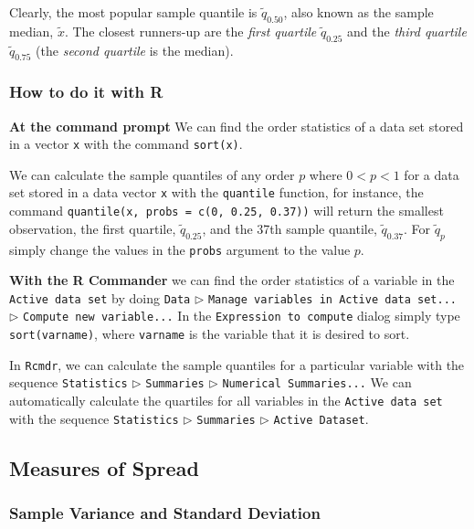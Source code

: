 \documentclass[]{book}
\numberwithin{equation}{chapter}
\numberwithin{figure}{chapter}
\theoremstyle{plain}
\theoremstyle{definition}
\theoremstyle{remark}
\theoremstyle{definition}
\theoremstyle{definition}
\theoremstyle{remark}
\begin{document}
Clearly, the most popular sample quantile is \(\tilde{q}_{0.50}\), also
known as the sample median, \(\tilde{x}\). The closest runners-up are
the \emph{first quartile} \(\tilde{q}_{0.25}\) and the \emph{third
quartile} \(\tilde{q}_{0.75}\) (the \emph{second quartile} is the
median).

\subsubsection{How to do it with R}\label{how-to-do-it-with-r-1}

\textbf{At the command prompt} We can find the order statistics of a
data set stored in a vector \texttt{x} with the command
\texttt{sort(x)}.

We can calculate the sample quantiles of any order \(p\) where \(0<p<1\)
for a data set stored in a data vector \texttt{x} with the
\texttt{quantile} function, for instance, the command
\texttt{quantile(x,\ probs\ =\ c(0,\ 0.25,\ 0.37))} will return the
smallest observation, the first quartile, \(\tilde{q}_{0.25}\), and the
37th sample quantile, \(\tilde{q}_{0.37}\). For \(\tilde{q}_{p}\) simply
change the values in the \texttt{probs} argument to the value \(p\).

\textbf{With the R Commander} we can find the order statistics of a
variable in the \texttt{Active\ data\ set} by doing \texttt{Data}
\(\triangleright\) \texttt{Manage\ variables\ in\ Active\ data\ set...}
\(\triangleright\) \texttt{Compute\ new\ variable...} In the
\texttt{Expression\ to\ compute} dialog simply type
\texttt{sort(varname)}, where \texttt{varname} is the variable that it
is desired to sort.

In \texttt{Rcmdr}, we can calculate the sample quantiles for a
particular variable with the sequence \texttt{Statistics}
\(\triangleright\) \texttt{Summaries} \(\triangleright\)
\texttt{Numerical\ Summaries...} We can automatically calculate the
quartiles for all variables in the \texttt{Active\ data\ set} with the
sequence \texttt{Statistics} \(\triangleright\) \texttt{Summaries}
\(\triangleright\) \texttt{Active\ Dataset}.

\subsection{Measures of Spread}\label{sub-measures-of-spread}

\subsubsection{Sample Variance and Standard
Deviation}\label{sample-variance-and-standard-deviation}
\end{document}

